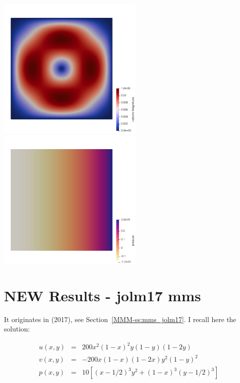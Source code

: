 \begin{center}
\includegraphics[width=7cm]{python_codes/fieldstone_120/images/bocg12_vel}
\includegraphics[width=7cm]{python_codes/fieldstone_120/images/bocg12_press}
\end{center}


\newpage
\section*{NEW Results - jolm17 mms}

It originates in \textcite{jolm17} (2017), see Section~\ref{MMM-ss:mms_jolm17}.
I recall here the solution:

\begin{eqnarray}
u(x,y) &=& 200x^2(1-x)^2y(1-y)(1-2y) \\
v(x,y) &=& -200x(1-x)(1-2x)y^2(1-y)^2 \\
p(x,y) &=& 10\left[(x-1/2)^3y^2+(1-x)^3(y-1/2)^3 \right]
\end{eqnarray}

